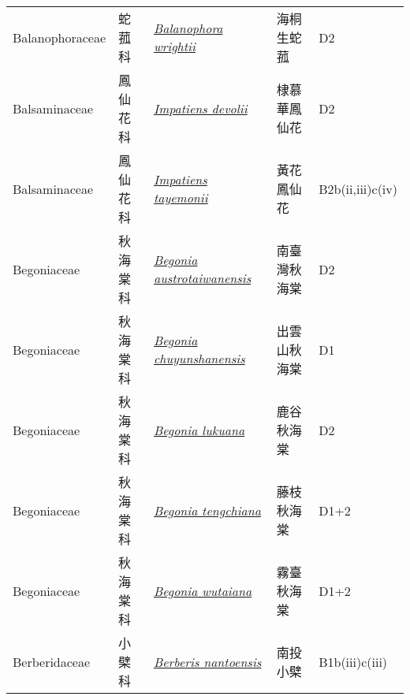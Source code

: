 {\begin{longtable}{L{2.5cm}L{2cm}L{5cm}L{2.5cm}L{3cm}}
    Balanophoraceae & 蛇菰科 & \href{http://www.theplantlist.org/tpl1.1/search?q=Balanophora+wrightii}{\textit{Balanophora wrightii} } & 海桐生蛇菰 & D2    \\
    Balsaminaceae & 鳳仙花科 & \href{http://www.theplantlist.org/tpl1.1/search?q=Impatiens+devolii}{\textit{Impatiens devolii} } & 棣慕華鳳仙花 & D2    \\
    Balsaminaceae & 鳳仙花科 & \href{http://www.theplantlist.org/tpl1.1/search?q=Impatiens+tayemonii}{\textit{Impatiens tayemonii} } & 黃花鳳仙花 & B2b(ii,iii)c(iv)    \\
    Begoniaceae & 秋海棠科 & \href{http://www.theplantlist.org/tpl1.1/search?q=Begonia+austrotaiwanensis}{\textit{Begonia austrotaiwanensis} } & 南臺灣秋海棠 & D2    \\
    Begoniaceae & 秋海棠科 & \href{http://www.theplantlist.org/tpl1.1/search?q=Begonia+chuyunshanensis}{\textit{Begonia chuyunshanensis} } & 出雲山秋海棠 & D1    \\
    Begoniaceae & 秋海棠科 & \href{http://www.theplantlist.org/tpl1.1/search?q=Begonia+lukuana}{\textit{Begonia lukuana} } & 鹿谷秋海棠 & D2    \\
    Begoniaceae & 秋海棠科 & \href{http://www.theplantlist.org/tpl1.1/search?q=Begonia+tengchiana}{\textit{Begonia tengchiana} } & 藤枝秋海棠 & D1+2    \\
    Begoniaceae & 秋海棠科 & \href{http://www.theplantlist.org/tpl1.1/search?q=Begonia+wutaiana}{\textit{Begonia wutaiana} } & 霧臺秋海棠 & D1+2    \\
    Berberidaceae & 小檗科 & \href{http://www.theplantlist.org/tpl1.1/search?q=Berberis+nantoensis}{\textit{Berberis nantoensis} } & 南投小檗 & B1b(iii)c(iii)    \\

\end{longtable}}
